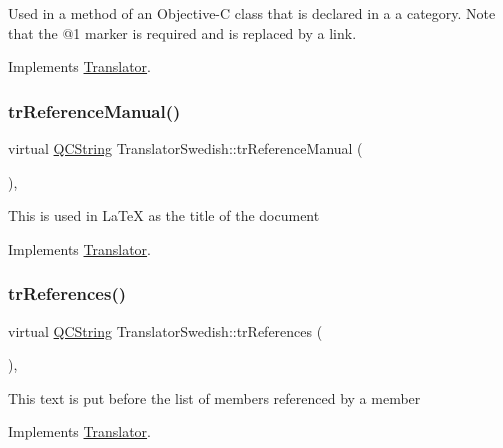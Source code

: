 Used in a method of an Objective-\/C class that is declared in a a category. Note that the @1 marker is required and is replaced by a link. 

Implements \mbox{\hyperlink{class_translator}{Translator}}.

\mbox{\label{class_translator_swedish_acdcf34dd7e1fd843df53f4f24e75d94b}} 
\subsubsection{\texorpdfstring{trReferenceManual()}{trReferenceManual()}}
{\footnotesize\ttfamily virtual \mbox{\hyperlink{class_q_c_string}{Q\+C\+String}} Translator\+Swedish\+::tr\+Reference\+Manual (\begin{DoxyParamCaption}{ }\end{DoxyParamCaption})\hspace{0.3cm}{\ttfamily [inline]}, {\ttfamily [virtual]}}

This is used in La\+TeX as the title of the document 

Implements \mbox{\hyperlink{class_translator}{Translator}}.

\mbox{\label{class_translator_swedish_ae65478edcd784c004882fa26d6d6044d}} 
\subsubsection{\texorpdfstring{trReferences()}{trReferences()}}
{\footnotesize\ttfamily virtual \mbox{\hyperlink{class_q_c_string}{Q\+C\+String}} Translator\+Swedish\+::tr\+References (\begin{DoxyParamCaption}{ }\end{DoxyParamCaption})\hspace{0.3cm}{\ttfamily [inline]}, {\ttfamily [virtual]}}

This text is put before the list of members referenced by a member 

Implements \mbox{\hyperlink{class_translator}{Translator}}.

\mbox{\label{class_translator_swedish_ac7d2cbb3bad287d49be8399ba1f58d87}} 
